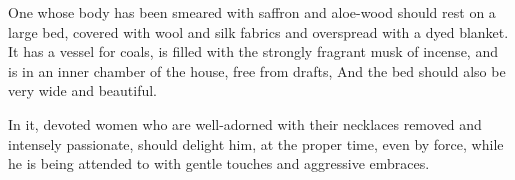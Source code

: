\begin{translation}
\item[32cd--34ab] 
One whose body has been smeared with saffron and aloe-wood %
should rest %
on a large %
bed, covered with wool and silk fabrics %
and overspread with a dyed blanket. %
It has a vessel for coals, %
is filled with the strongly fragrant musk of incense, %
 and is in an inner chamber of the house, %
free from drafts, %
And the bed should also be %
very wide %
and beautiful. %

\item[34cd--35] %
In it, %
devoted %
women who are well-adorned %
with their necklaces removed %
and intensely passionate, %
should delight him, %
at the proper time, %
even by force, %
while he is being attended to %
with gentle touches %
and aggressive embraces. %



\end{translation}

